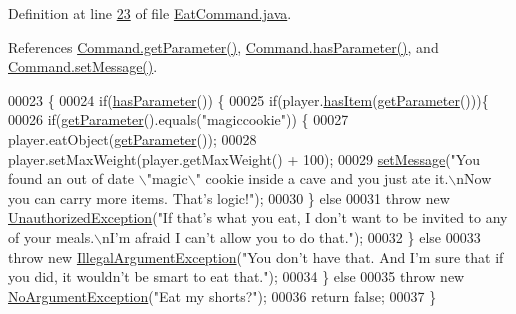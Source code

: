 Definition at line \hyperlink{EatCommand_8java_source_l00023}{23} of file \hyperlink{EatCommand_8java_source}{Eat\-Command.\-java}.



References \hyperlink{Command_8java_source_l00025}{Command.\-get\-Parameter()}, \hyperlink{Command_8java_source_l00041}{Command.\-has\-Parameter()}, and \hyperlink{Command_8java_source_l00049}{Command.\-set\-Message()}.


\begin{DoxyCode}
00023                                                                                                            
               \{
00024         \textcolor{keywordflow}{if}(\hyperlink{classCommand_a9b042558156d6749566e0fd9d48d3bfe}{hasParameter}()) \{
00025             \textcolor{keywordflow}{if}(player.\hyperlink{classPlayer_a90cb3f05b491eaed668fe54b9258b755}{hasItem}(\hyperlink{classCommand_a1ced3739d546770ba1389e6ce228255e}{getParameter}()))\{
00026                 \textcolor{keywordflow}{if}(\hyperlink{classCommand_a1ced3739d546770ba1389e6ce228255e}{getParameter}().equals(\textcolor{stringliteral}{"magiccookie"})) \{
00027                     player.eatObject(\hyperlink{classCommand_a1ced3739d546770ba1389e6ce228255e}{getParameter}());
00028                     player.setMaxWeight(player.getMaxWeight() + 100);
00029                     \hyperlink{classCommand_a715709d8f0ab65879d79ad1725c96f17}{setMessage}(\textcolor{stringliteral}{"You found an out of date \(\backslash\)"magic\(\backslash\)" cookie inside a cave and you
       just ate it.\(\backslash\)nNow you can carry more items. That's logic!"});
00030                 \} \textcolor{keywordflow}{else}
00031                     \textcolor{keywordflow}{throw} \textcolor{keyword}{new} \hyperlink{classUnauthorizedException}{UnauthorizedException}(\textcolor{stringliteral}{"If that's what you eat, I don't
       want to be invited to any of your meals.\(\backslash\)nI'm afraid I can't allow you to do that."});
00032             \} \textcolor{keywordflow}{else} 
00033                 \textcolor{keywordflow}{throw} \textcolor{keyword}{new} \hyperlink{classIllegalArgumentException}{IllegalArgumentException}(\textcolor{stringliteral}{"You don't have that. And I'm
       sure that if you did, it wouldn't be smart to eat that."});
00034         \} \textcolor{keywordflow}{else} 
00035             \textcolor{keywordflow}{throw} \textcolor{keyword}{new} \hyperlink{classNoArgumentException}{NoArgumentException}(\textcolor{stringliteral}{"Eat my shorts?"});
00036         \textcolor{keywordflow}{return} \textcolor{keyword}{false};
00037     \}
\end{DoxyCode}


